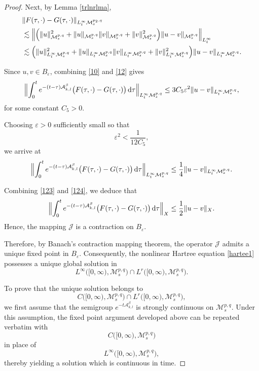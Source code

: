 \documentclass[12pt,reqno,a4paper]{amsart}
\numberwithin{equation}{section}
\theoremstyle{plain}
\theoremstyle{definition}
\theoremstyle{remark}
\def\M{\mathcal{M}}
\def \Ad{\mathcal{A}_{k,l}}
\def \M{{\mathcal M}}
\begin{document}
\begin{proof}

Next, by Lemma \ref{trlnrlma},
\begin{align}
\label{12}
&
\|F(\tau,\cdot)-G(\tau,\cdot)\|_{L^{\infty}_{t}\M^{p_{2},q}_{s}}
\nonumber\\
&\lesssim
\Bigl\|
\Bigl(
\|u\|_{\M^{p,q}_{s}}^{2}
+
\|u\|_{\M^{p,q}_{s}}
\|v\|_{\M^{p,q}_{s}}
+
\|v\|_{\M^{p,q}_{s}}^{2}
\Bigr)
\|u-v\|_{\M^{p,q}_{s}}
\Bigr\|_{L^{\infty}_{t}}
\nonumber\\
&\lesssim
\Bigl(
\|u\|_{L^{\infty}_{t}\M^{p,q}_{s}}^{2}
+
\|u\|_{L^{\infty}_{t}\M^{p,q}_{s}}
\|v\|_{L^{\infty}_{t}\M^{p,q}_{s}}
+
\|v\|_{L^{\infty}_{t}\M^{p,q}_{s}}^{2}
\Bigr)
\|u-v\|_{L^{\infty}_{t}\M^{p,q}_{s}}.
\end{align}

Since $u,v\in B_{\varepsilon}$, combining \eqref{10} and \eqref{12} gives
\begin{align*}
\Bigl\|
\int_{0}^{t}
e^{-(t-\tau)\Ad^{\beta}}
\bigl(F(\tau,\cdot)-G(\tau,\cdot)\bigr)
\,\mathrm{d}\tau
\Bigr\|_{L^{\infty}_{t}\M^{p,q}_{s}}
\leq
3C_{5}\varepsilon^{2}
\|u-v\|_{L^{\infty}_{t}\M^{p,q}_{s}},
\end{align*}
for some constant $C_{5}>0$.

Choosing $\varepsilon>0$ sufficiently small so that
\[
\varepsilon^{2}
<
\frac{1}{12C_{5}},
\]
we arrive at
\begin{align}
\label{124}
\Bigl\|
\int_{0}^{t}
e^{-(t-\tau)\Ad^{\beta}}
\bigl(F(\tau,\cdot)-G(\tau,\cdot)\bigr)
\,\mathrm{d}\tau
\Bigr\|_{L^{\infty}_{t}\M^{p,q}_{s}}
\leq
\frac{1}{4}
\|u-v\|_{L^{\infty}_{t}\M^{p,q}_{s}}.
\end{align}

Combining \eqref{123} and \eqref{124}, we deduce that
\[
\Bigl\|
\int_{0}^{t}
e^{-(t-\tau)\Ad^{\beta}}
\bigl(F(\tau,\cdot)-G(\tau,\cdot)\bigr)
\,\mathrm{d}\tau
\Bigr\|_{X}
\leq
\frac{1}{2}
\|u-v\|_{X}.
\]
Hence, the mapping $\mathcal{J}$ is a contraction on $B_{\varepsilon}$.

Therefore, by Banach's contraction mapping theorem, the operator $\mathcal{J}$ admits a unique fixed point in $B_{\varepsilon}$. Consequently, the nonlinear Hartree equation \eqref{hartee1} possesses a unique global solution in
\[
L^{\infty}\bigl([0,\infty),\M^{p,q}_{s}\bigr)
\cap
L^{r}\bigl([0,\infty),\M^{p,q}_{s}\bigr).
\]



To prove that the unique solution belongs to
\[
C\bigl([0,\infty),\M^{p,q}_{s}\bigr)
\cap
L^{r}\bigl([0,\infty),\M^{p,q}_{s}\bigr),
\]
we first assume that the semigroup $e^{-t\Ad^{\beta}}$ is strongly
continuous on $\M^{p,q}_{s}$. Under this assumption, the fixed point
argument developed above can be repeated verbatim with
\[
C\bigl([0,\infty),\M^{p,q}_{s}\bigr)
\]
in place of
\[
L^{\infty}\bigl([0,\infty),\M^{p,q}_{s}\bigr),
\]
thereby yielding a solution which is continuous in time.


\end{proof}
\end{document}
